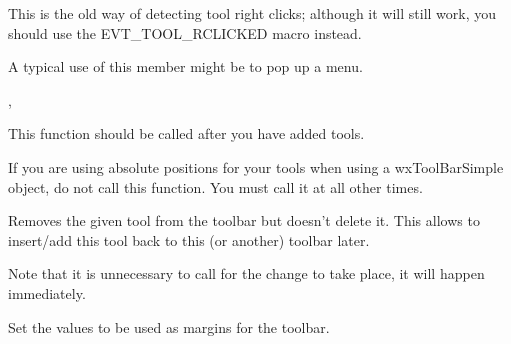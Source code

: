 This is the old way of detecting tool right clicks; although it will still work,
you should use the EVT\_TOOL\_RCLICKED macro instead.






A typical use of this member might be to pop up a menu.


,\rtfsp
{}

\label{wxtoolbarrealize}


This function should be called after you have added tools.

If you are using absolute positions for your tools when using a wxToolBarSimple object,
do not call this function. You must call it at all other times.

\label{wxtoolbarremovetool}


Removes the given tool from the toolbar but doesn't delete it. This allows to
insert/add this tool back to this (or another) toolbar later.

Note that it is unnecessary to call  for the
change to take place, it will happen immediately.



\label{wxtoolbarsetmargins}



Set the values to be used as margins for the toolbar.



